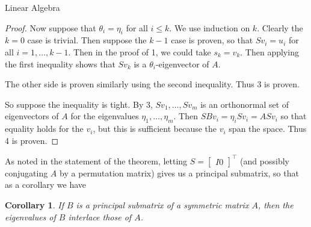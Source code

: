 \documentclass{article}
\newtheorem{cor}{Corollary}
\begin{document}
\begin{section}{Linear Algebra}
\begin{proof}
    Now suppose that $\theta_i = \eta_i$ for all $i \leq k$.
    We use induction on $k$.
    Clearly the $k = 0$ case is trivial.
    Then suppose the $k-1$ case is proven, so that $Sv_i = u_i$ for all $i = 1, \ldots, k-1$.
    Then in the proof of 1, we could take $s_k = v_k$.
    Then applying the first inequality shows that $Sv_k$ is a $\theta_i$-eigenvector of $A$.

    The other side is proven similarly using the second inequality.
    Thus 3 is proven.

    So suppose the inequality is tight.
    By 3, $Sv_1, \ldots, Sv_m$ is an orthonormal set of eigenvectors of $A$ for the eigenvalues $\eta_1, \ldots, \eta_m$.
    Then $SBv_i = \eta_iSv_i = ASv_i$ so that equality holds for the $v_i$, but this is sufficient because the $v_i$ span the space.
    Thus 4 is proven.
  \end{proof}

  As noted in the statement of the theorem, letting $S = \begin{bmatrix} I 0 \end{bmatrix}^\intercal$ (and possibly conjugating $A$ by a permutation matrix) gives us a principal submatrix, so that as a corollary we have
    \begin{cor}
      If $B$ is a principal submatrix of a symmetric matrix $A$, then the eigenvalues of $B$ interlace those of $A$.
    \end{cor}

\end{section}
\end{document}
